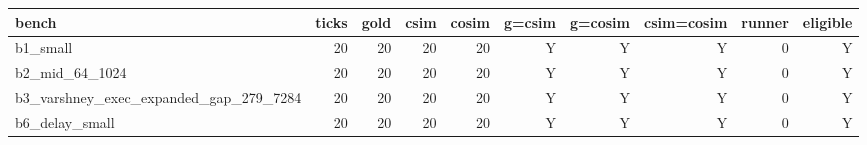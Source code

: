 \begin{tabular}{lrrrrrrrrr}
\hline
bench & ticks & gold & csim & cosim & g=csim & g=cosim & csim=cosim & runner & eligible \\
\hline
b1\_small & 20 & 20 & 20 & 20 & Y & Y & Y & 0 & Y \\
b2\_mid\_64\_1024 & 20 & 20 & 20 & 20 & Y & Y & Y & 0 & Y \\
b3\_varshney\_exec\_expanded\_gap\_279\_7284 & 20 & 20 & 20 & 20 & Y & Y & Y & 0 & Y \\
b6\_delay\_small & 20 & 20 & 20 & 20 & Y & Y & Y & 0 & Y \\
\hline
\end{tabular}
